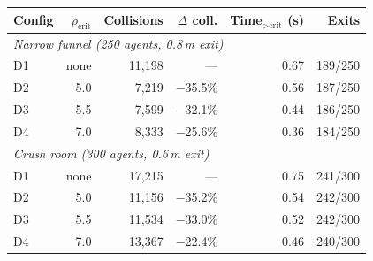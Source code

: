 \begin{tabular}{@{}lrrrrr@{}}
\hline
\textbf{Config} & $\rho_\text{crit}$ & \textbf{Collisions} & \textbf{$\Delta$ coll.} & \textbf{Time$_{>\text{crit}}$ (s)} & \textbf{Exits} \\
\hline
\multicolumn{6}{l}{\textit{Narrow funnel (250 agents, 0.8\,m exit)}} \\
D1 & none & 11{,}198 & --- & 0.67 & 189/250 \\
D2 & 5.0 & 7{,}219 & $-$35.5\% & 0.56 & 187/250 \\
D3 & 5.5 & 7{,}599 & $-$32.1\% & 0.44 & 186/250 \\
D4 & 7.0 & 8{,}333 & $-$25.6\% & 0.36 & 184/250 \\
\hline
\multicolumn{6}{l}{\textit{Crush room (300 agents, 0.6\,m exit)}} \\
D1 & none & 17{,}215 & --- & 0.75 & 241/300 \\
D2 & 5.0 & 11{,}156 & $-$35.2\% & 0.54 & 242/300 \\
D3 & 5.5 & 11{,}534 & $-$33.0\% & 0.52 & 242/300 \\
D4 & 7.0 & 13{,}367 & $-$22.4\% & 0.46 & 240/300 \\
\hline
\end{tabular}

